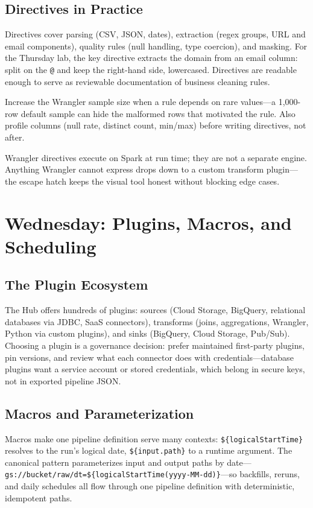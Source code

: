 \subsection{Directives in Practice}
Directives cover parsing (CSV, JSON, dates), extraction (regex groups, URL and email components), quality rules (null handling, type coercion), and masking. For the Thursday lab, the key directive extracts the domain from an email column: split on the \texttt{@} and keep the right-hand side, lowercased. Directives are readable enough to serve as reviewable documentation of business cleaning rules.

\begin{tipbox}
Increase the Wrangler sample size when a rule depends on rare values---a 1{,}000-row default sample can hide the malformed rows that motivated the rule. Also profile columns (null rate, distinct count, min/max) before writing directives, not after.
\end{tipbox}

\begin{notebox}
Wrangler directives execute on Spark at run time; they are not a separate engine. Anything Wrangler cannot express drops down to a custom transform plugin---the escape hatch keeps the visual tool honest without blocking edge cases.
\end{notebox}

\section{Wednesday: Plugins, Macros, and Scheduling}

\subsection{The Plugin Ecosystem}
The Hub offers hundreds of plugins: sources (Cloud Storage, BigQuery, relational databases via JDBC, SaaS connectors), transforms (joins, aggregations, Wrangler, Python via custom plugins), and sinks (BigQuery, Cloud Storage, Pub/Sub). Choosing a plugin is a governance decision: prefer maintained first-party plugins, pin versions, and review what each connector does with credentials---database plugins want a service account or stored credentials, which belong in secure keys, not in exported pipeline JSON.

\subsection{Macros and Parameterization}
Macros make one pipeline definition serve many contexts: \texttt{\$\{logicalStartTime\}} resolves to the run's logical date, \texttt{\$\{input.path\}} to a runtime argument. The canonical pattern parameterizes input and output paths by date---\texttt{gs://bucket/raw/dt=\$\{logicalStartTime(yyyy-MM-dd)\}}---so backfills, reruns, and daily schedules all flow through one pipeline definition with deterministic, idempotent paths.

